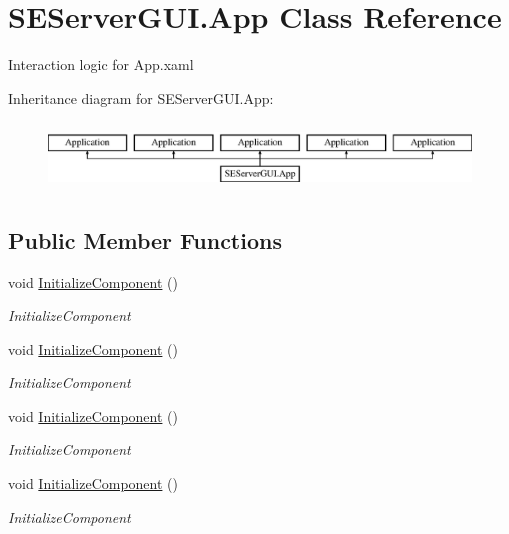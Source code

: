 \hypertarget{class_s_e_server_g_u_i_1_1_app}{}\section{S\+E\+Server\+G\+U\+I.\+App Class Reference}
\label{class_s_e_server_g_u_i_1_1_app}


Interaction logic for App.\+xaml  


Inheritance diagram for S\+E\+Server\+G\+U\+I.\+App\+:\begin{figure}[H]
\begin{center}
\leavevmode
\includegraphics[height=1.836066cm]{class_s_e_server_g_u_i_1_1_app}
\end{center}
\end{figure}
\subsection*{Public Member Functions}
\begin{DoxyCompactItemize}
\item 
void \hyperlink{class_s_e_server_g_u_i_1_1_app_a195c97859babbe76a73244cc576cab98}{Initialize\+Component} ()
\begin{DoxyCompactList}\small\item\em Initialize\+Component \end{DoxyCompactList}\item 
void \hyperlink{class_s_e_server_g_u_i_1_1_app_a195c97859babbe76a73244cc576cab98}{Initialize\+Component} ()
\begin{DoxyCompactList}\small\item\em Initialize\+Component \end{DoxyCompactList}\item 
void \hyperlink{class_s_e_server_g_u_i_1_1_app_a195c97859babbe76a73244cc576cab98}{Initialize\+Component} ()
\begin{DoxyCompactList}\small\item\em Initialize\+Component \end{DoxyCompactList}\item 
void \hyperlink{class_s_e_server_g_u_i_1_1_app_a195c97859babbe76a73244cc576cab98}{Initialize\+Component} ()
\begin{DoxyCompactList}\small\item\em Initialize\+Component \end{DoxyCompactList}\end{DoxyCompactItemize}

